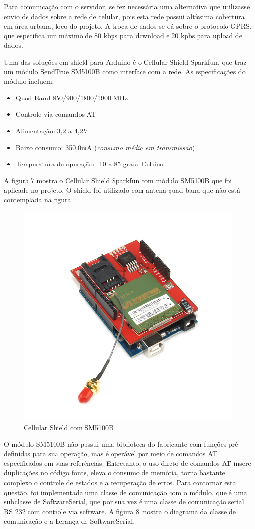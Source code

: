 Para comunicação com o servidor, se fez necessária uma alternativa que utilizasse
envio de dados sobre a rede de celular, pois esta rede possui altíssima cobertura
em área urbana, foco do projeto. A troca de dados se dá sobre o protocolo GPRS, que
especifica um máximo de 80 kbps para download e 20 kpbs para upload de dados.

Uma das soluções em shield para Arduino é o Cellular Shield Sparkfun, que traz um
módulo SendTrue SM5100B como interface com a rede. As especificações do módulo incluem:

\begin{itemize}
			\item Quad-Band 850/900/1800/1900 MHz
			\item Controle via comandos AT
			\item Alimentação: 3,2 a 4,2V
			\item Baixo consumo: 350,0mA (\textit{consumo médio em transmissão})
			\item Temperatura de operação: -10 a 85 graus Celsius.
\end{itemize}

A figura 7 mostra o Cellular Shield Sparkfun com módulo SM5100B que foi aplicado
no projeto. O shield foi utilizado com antena quad-band que não está contemplada
na figura.

\begin{figure}[!htb]
	\centering
	\includegraphics[width=4.00cm\textwidth]{figures/gsm.jpg}
	\caption{Cellular Shield com SM5100B}
	\label{Figura 7}
\end{figure}

O módulo SM5100B não possui uma biblioteca do fabricante com funções pré-definidas para sua 
operação, mas é operável por meio de comandos AT especificados em suas referências. Entretanto,
o uso direto de comandos AT insere duplicações no código fonte, eleva o consumo de memória,
torna bastante complexo o controle de estados e a recuperação de erros. Para contornar esta questão,
foi implementada uma classe de comunicação com o módulo, que é uma subclasse de SoftwareSerial, que por
sua vez é uma classe de comunicação serial RS 232 com controle via software. A figura 8 mostra o diagrama
da classe de comunicação e a herança de SoftwareSerial.

